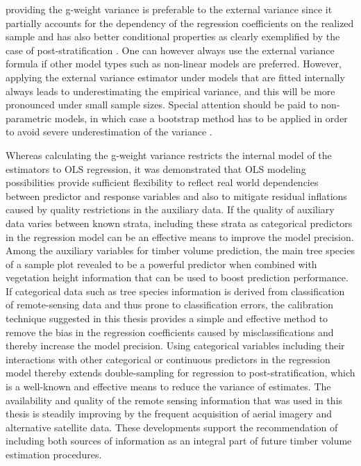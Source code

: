 providing the g-weight variance is preferable to the external variance since it partially accounts for the dependency of the regression coefficients on the realized sample and has also better conditional properties as clearly exemplified by the case of post-stratification \citep{mandallaz2016}. One can however always use the external variance formula if other model types such as non-linear models are preferred. However, applying the external variance estimator under models that are fitted internally always leads to underestimating the empirical variance, and this will be more pronounced under small sample sizes. Special attention should be paid to non-parametric models, in which case a bootstrap method has to be applied in order to avoid severe underestimation of the variance \citep{massey2015a, massey2015_thesis}.\par

Whereas calculating the g-weight variance restricts the internal model of the estimators to OLS regression, it was demonstrated that OLS modeling possibilities provide sufficient flexibility to reflect real world dependencies between predictor and response variables and also to mitigate residual inflations caused by quality restrictions in the auxiliary data. If the quality of auxiliary data varies between known strata, including these strata as categorical predictors in the regression model can be an effective means to improve the model precision. Among the auxiliary variables for timber volume prediction, the main tree species of a sample plot revealed to be a powerful predictor when combined with vegetation height information that can be used to boost prediction performance. If categorical data such as tree species information is derived from classification of remote-sensing data and thus prone to classification errors, the calibration technique suggested in this thesis provides a simple and effective method to remove the bias in the regression coefficients caused by misclassifications and thereby increase the model precision. Using categorical variables including their interactions with other categorical or continuous predictors in the regression model thereby extends double-sampling for regression to post-stratification, which is a well-known and effective means to reduce the variance of estimates. The availability and quality of the remote sensing information that was used in this thesis is steadily improving by the frequent acquisition of aerial imagery and alternative satellite data. These developments support the recommendation of including both sources of information as an integral part of future timber volume estimation procedures.\par

